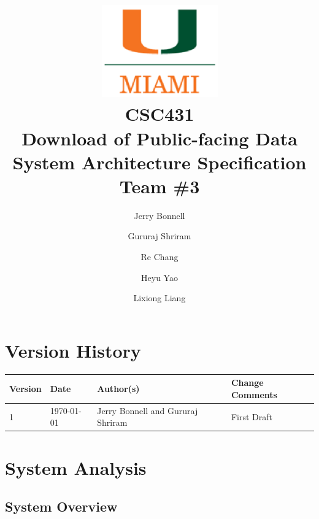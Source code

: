 \documentclass{article}
\begin{document}
	
	\title{
		\includegraphics{images/um_logo.png} \\
		\vspace{0.1in}
		CSC431 \\
		\vspace{0.2in}
		\textbf{Download of Public-facing Data} \\
		\large System Architecture Specification \\
		Team \#3
	}
	
	\author{
		Jerry Bonnell
		\and Gururaj Shriram
		\and Re Chang
		\and Heyu Yao
		\and Lixiong Liang
	}
	
	\date{}
	\maketitle
	
	\clearpage
	\section*{Version History}
	
	\begin{tabularx}{\textwidth}{| l | l | X | l |}
		\hline
		\textbf{Version} & \textbf{Date} & \textbf{Author(s)} & \textbf{Change Comments} \\
		\hline
		1 & \today & Jerry Bonnell and Gururaj Shriram & First Draft \\
		\hline
	\end{tabularx}
	
	\clearpage
	\tableofcontents
	
	\clearpage
	\listoffigures
	\listoftables
	
	\clearpage
	
	\section{System Analysis}
	
	\subsection{System Overview}
	
\end{document}
